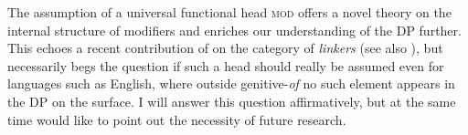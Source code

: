 The assumption of a universal functional head \textsc{mod} offers a novel theory on the internal structure of modifiers and enriches our understanding of the DP further. This echoes a recent contribution of \citet{richards:2023:finding} on the category of \textit{linkers} (see also \citealt{richards:1997:comp, richards:2010:uttering, baker:2006:linkers}), but necessarily begs the question if such a head should really be assumed even for languages such as English, where outside genitive-\textit{of} no such element appears in the DP on the surface. I will answer this question affirmatively, but at the same time would like to point out the necessity of future research.


